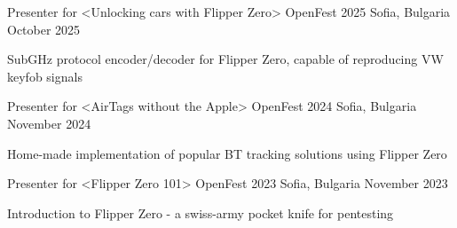 

\begin{cventries}

  \cventry
    {Presenter for <Unlocking cars with Flipper Zero>} %
    {OpenFest 2025} %
    {Sofia, Bulgaria} %
    {October 2025} %
    {
      \begin{cvitems} %
        \item {SubGHz protocol encoder/decoder for Flipper Zero, capable of reproducing VW keyfob signals}
      \end{cvitems}
    }

  \cventry
    {Presenter for <AirTags without the Apple>} %
    {OpenFest 2024} %
    {Sofia, Bulgaria} %
    {November 2024} %
    {
      \begin{cvitems} %
        \item {Home-made implementation of popular BT tracking solutions using Flipper Zero}
      \end{cvitems}
    }

  \cventry
    {Presenter for <Flipper Zero 101>} %
    {OpenFest 2023} %
    {Sofia, Bulgaria} %
    {November 2023} %
    {
      \begin{cvitems} %
        \item {Introduction to Flipper Zero - a swiss-army pocket knife for pentesting}
      \end{cvitems}
    }

\end{cventries}
